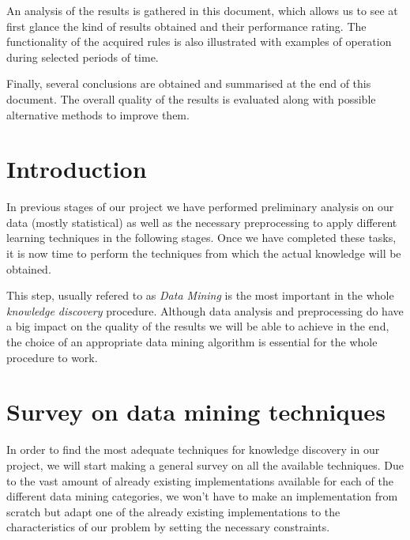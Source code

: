 \documentclass[a4paper,12pt]{article}
\begin{document}
An analysis of the results is gathered in this document, which allows us to see at first glance the kind of results obtained and their performance rating. The functionality of the acquired rules is also illustrated with examples of operation during selected periods of time.

Finally, several conclusions are obtained and summarised at the end of this document. The overall quality of the results is evaluated along with possible alternative methods to improve them. 

\newpage
\tableofcontents %
\cleardoublepage
{} %
\listoffigures %

\cleardoublepage
{} %
\listoftables %
\cleardoublepage

\setcounter{page}{1}
\section{Introduction}
In previous stages of our project we have performed preliminary analysis on our data (mostly statistical) as well as the necessary preprocessing to apply different learning techniques in the following stages. Once we have completed these tasks, it is now time to perform the techniques from which the actual knowledge will be obtained.

This step, usually refered to as \emph{Data Mining} is the most important in the whole \emph{knowledge discovery} procedure. Although data analysis and preprocessing do have a big impact on the quality of the results we will be able to achieve in the end, the choice of an appropriate data mining algorithm is essential for the whole procedure to work.

\section{Survey on data mining techniques} 
\label{sec:datamining}
In order to find the most adequate techniques for knowledge discovery in our project, we will start making a general survey on all the available techniques. Due to the vast amount of already existing implementations available for each of the different data mining categories, we won't have to make an implementation from scratch but adapt one of the already existing implementations to the characteristics of our problem by setting the necessary constraints.
\end{document}
